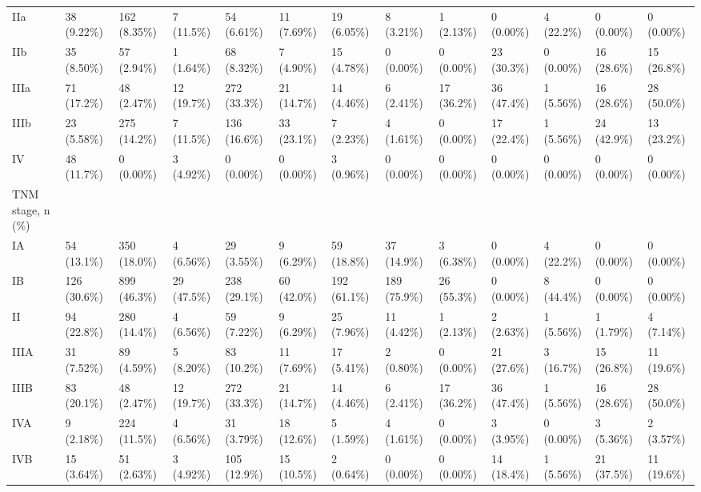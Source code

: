 \begin{landscape}
\begin{center}
\begin{longtable}{p{5.2cm}p{3.0cm}}
IIa & 38 (9.22\%) & 162 (8.35\%) & 7 (11.5\%) & 54 (6.61\%) & 11 (7.69\%) & 19 (6.05\%) & 8 (3.21\%) & 1 (2.13\%) & 0 (0.00\%) & 4 (22.2\%) & 0 (0.00\%) & 0 (0.00\%) \\
IIb & 35 (8.50\%) & 57 (2.94\%) & 1 (1.64\%) & 68 (8.32\%) & 7 (4.90\%) & 15 (4.78\%) & 0 (0.00\%) & 0 (0.00\%) & 23 (30.3\%) & 0 (0.00\%) & 16 (28.6\%) & 15 (26.8\%) \\
IIIa & 71 (17.2\%) & 48 (2.47\%) & 12 (19.7\%) & 272 (33.3\%) & 21 (14.7\%) & 14 (4.46\%) & 6 (2.41\%) & 17 (36.2\%) & 36 (47.4\%) & 1 (5.56\%) & 16 (28.6\%) & 28 (50.0\%) \\
IIIb & 23 (5.58\%) & 275 (14.2\%) & 7 (11.5\%) & 136 (16.6\%) & 33 (23.1\%) & 7 (2.23\%) & 4 (1.61\%) & 0 (0.00\%) & 17 (22.4\%) & 1 (5.56\%) & 24 (42.9\%) & 13 (23.2\%) \\
IV & 48 (11.7\%) & 0 (0.00\%) & 3 (4.92\%) & 0 (0.00\%) & 0 (0.00\%) & 3 (0.96\%) & 0 (0.00\%) & 0 (0.00\%) & 0 (0.00\%) & 0 (0.00\%) & 0 (0.00\%) & 0 (0.00\%) \\
TNM stage, n (\%) &  &  &  &  &  &  &  &  &  &  &  &  \\
IA & 54 (13.1\%) & 350 (18.0\%) & 4 (6.56\%) & 29 (3.55\%) & 9 (6.29\%) & 59 (18.8\%) & 37 (14.9\%) & 3 (6.38\%) & 0 (0.00\%) & 4 (22.2\%) & 0 (0.00\%) & 0 (0.00\%) \\
IB & 126 (30.6\%) & 899 (46.3\%) & 29 (47.5\%) & 238 (29.1\%) & 60 (42.0\%) & 192 (61.1\%) & 189 (75.9\%) & 26 (55.3\%) & 0 (0.00\%) & 8 (44.4\%) & 0 (0.00\%) & 0 (0.00\%) \\
II & 94 (22.8\%) & 280 (14.4\%) & 4 (6.56\%) & 59 (7.22\%) & 9 (6.29\%) & 25 (7.96\%) & 11 (4.42\%) & 1 (2.13\%) & 2 (2.63\%) & 1 (5.56\%) & 1 (1.79\%) & 4 (7.14\%) \\
IIIA & 31 (7.52\%) & 89 (4.59\%) & 5 (8.20\%) & 83 (10.2\%) & 11 (7.69\%) & 17 (5.41\%) & 2 (0.80\%) & 0 (0.00\%) & 21 (27.6\%) & 3 (16.7\%) & 15 (26.8\%) & 11 (19.6\%) \\
IIIB & 83 (20.1\%) & 48 (2.47\%) & 12 (19.7\%) & 272 (33.3\%) & 21 (14.7\%) & 14 (4.46\%) & 6 (2.41\%) & 17 (36.2\%) & 36 (47.4\%) & 1 (5.56\%) & 16 (28.6\%) & 28 (50.0\%) \\
IVA & 9 (2.18\%) & 224 (11.5\%) & 4 (6.56\%) & 31 (3.79\%) & 18 (12.6\%) & 5 (1.59\%) & 4 (1.61\%) & 0 (0.00\%) & 3 (3.95\%) & 0 (0.00\%) & 3 (5.36\%) & 2 (3.57\%) \\
IVB & 15 (3.64\%) & 51 (2.63\%) & 3 (4.92\%) & 105 (12.9\%) & 15 (10.5\%) & 2 (0.64\%) & 0 (0.00\%) & 0 (0.00\%) & 14 (18.4\%) & 1 (5.56\%) & 21 (37.5\%) & 11 (19.6\%) \\

\end{longtable}
\end{center}
\end{landscape}
